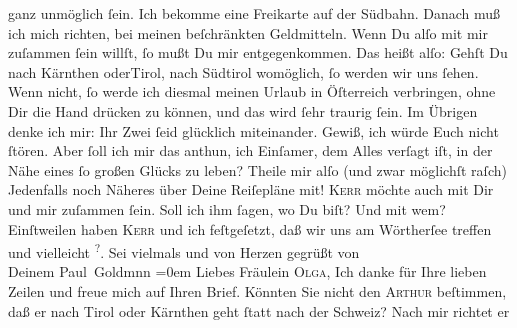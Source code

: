 \begin{ledgroupsized}[t]{13cm}
               ganz unmöglich ſein. Ich bekomme eine Freikarte auf der Südbahn. Danach muß ich mich richten, bei meinen beſchränkten
               Geldmitteln. Wenn Du alſo mit mir {\pb}zuſammen ſein
               willſt, ſo mußt Du mir entgegenkommen. Das heißt alſo: Gehſt Du nach \introOben{}Kärnthen oder\introOben{}{ }Tirol, nach Südtirol womöglich, ſo werden wir uns ſehen. Wenn  nicht, ſo werde ich diesmal meinen Urlaub in Öſterreich verbringen, ohne Dir die Hand drücken zu können, und das wird
               ſehr traurig ſein. Im Übrigen denke ich mir: Ihr Zwei ſeid glücklich miteinander. Gewiß, ich würde Euch
               nicht ſtören. Aber ſoll ich mir das anthun, ich Einſamer, {\pb}dem Alles verſagt iſt, in der Nähe eines ſo großen
               Glücks zu leben?\pend
           \pstart
           Theile mir alſo \introOben{}(und zwar möglichſt raſch)\introOben{}{ } Jedenfalls noch Näheres über Deine Reiſepläne mit! \textsc{Kerr} möchte auch mit Dir und mir zuſammen ſein. Soll ich ihm ſagen, wo Du biſt? Und
               mit wem? Einſtweilen haben \textsc{Kerr} und ich feſtgeſetzt, daß wir uns am Wörtherſee treffen und vielleicht \label{K_L03071-7v}\label{K_L03071-7h}\substVorne{}\textsuperscript{?}\substDazwischen{}.\substHinten{}\pend
           \pstart
           {\pb}Sei vielmals und von Herzen gegrüßt von {\\[\baselineskip]}Deinem
                  \spacefill\mbox{Paul Goldmnn}\pend
           \leftskip=0em{}{\bigskip}\pstart
           \noindent{}Liebes Fräulein \textsc{Olga}, Ich
               danke für Ihre lieben Zeilen und freue mich auf Ihren Brief. Könnten Sie nicht den
                  \textsc{Arthur} beſtimmen, daß er nach Tirol oder Kärnthen geht
               ſtatt nach der Schweiz? Nach mir richtet er

\end{ledgroupsized}
